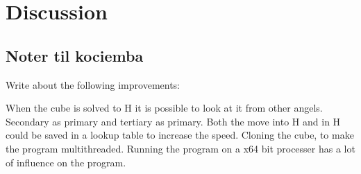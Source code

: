 \chapter{Discussion}

\section{Noter til kociemba}

Write about the following improvements:

When the cube is solved to H it is possible to look at it from other angels. Secondary as primary and tertiary as primary.
Both the move into H and in H could be saved in a lookup table to increase the speed.
Cloning the cube, to make the program multithreaded.
Running the program on a x64 bit processer has a lot of influence on the program. 